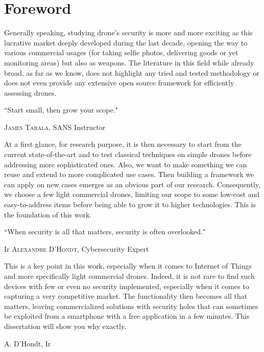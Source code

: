 \chapter*{Foreword}
\thispagestyle{empty}

\vspace{-2cm}
\vfill

\begin{center}
\begin{minipage}{15cm}
Generally speaking, studying drone's security is more and more exciting as this lucrative market deeply developed during the last decade, opening the way to various commercial usages (for taking selfie photos, delivering goods or yet monitoring areas) but also as weapons. The literature in this field while already broad, as far as we know, does not highlight any tried and tested methodology or does not even provide any extensive open source framework for efficiently assessing drones.

\vspace{-1.2cm}
\epigraph{``Start small, then grow your scope."}{\normalfont \textsc{James Tarala}, SANS Instructor}
\vspace{-1.2cm}

At a first glance, for research purpose, it is then necessary to start from the current state-of-the-art and to test classical techniques on simple drones before addressing more sophisticated ones. Also, we want to make something we can reuse and extend to more complicated use cases. Then building a framework we can apply on new cases emerges as an obvious part of our research. Consequently, we choose a few light commercial drones, limiting our scope to some low-cost and easy-to-address items before being able to grow it to higher technologies. This is the foundation of this work.

\epigraph{``When security is all that matters, \newline security is often overlooked."}{Ir \textsc{Alexandre D'Hondt}, Cybersecurity Expert}
\vspace{-1.2cm}
This is a key point in this work, especially when it comes to Internet of Things and more specifically light commercial drones. Indeed, it is not rare to find such devices with few or even no security implemented, especially when it comes to capturing a very competitive market. The functionality then becomes all that matters, leaving commercialized solutions with security holes that can sometimes be exploited from a smartphone with a free application in a few minutes. This dissertation will show you why exactly.

\vspace{1cm}
\begin{flushright}
\begin{minipage}{4cm}
\raggedleft
A. D'Hondt, Ir
\end{minipage}
\end{flushright}

\end{minipage}
\end{center}

\vfill
